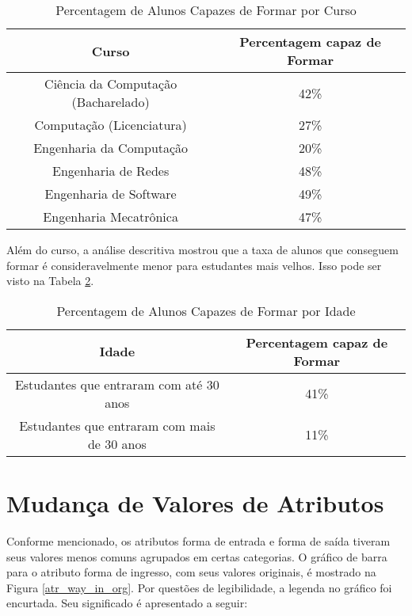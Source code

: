 \begin{table}
\caption{Percentagem de Alunos Capazes de Formar por Curso}
\begin{center}
\begin{tabular}[c]{| c | c |}
    \hline
    \textbf{Curso} & \textbf{Percentagem capaz de Formar} \\
    \hline
    Ciência da Computação (Bacharelado) & 42\% \\
    \hline
    Computação (Licenciatura) & 27\% \\
    \hline
    Engenharia da Computação & 20\% \\
    \hline
    Engenharia de Redes & 48\% \\
    \hline
    Engenharia de Software & 49\% \\
    \hline
    Engenharia Mecatrônica & 47\% \\
    \hline
\end{tabular}
\end{center}
\label{justificativa_4_curso}
\end{table}

\par Além do curso, a análise descritiva mostrou que a taxa de alunos que conseguem
formar é consideravelmente menor para estudantes mais velhos. Isso pode ser visto na
Tabela \ref{justificativa_4_idade}.

\begin{table}
\caption{Percentagem de Alunos Capazes de Formar por Idade}
\begin{center}
\begin{tabular}[c]{| c | c |}
    \hline
    \textbf{Idade} & \textbf{Percentagem capaz de Formar} \\
    \hline
    Estudantes que entraram com até 30 anos & 41\% \\
    \hline
    Estudantes que entraram com mais de 30 anos & 11\% \\
    \hline
\end{tabular}
\end{center}
\label{justificativa_4_idade}
\end{table}

\section{Mudança de Valores de Atributos} \label{just_mud_atr}
Conforme mencionado, os atributos forma de entrada e forma de saída tiveram seus
valores menos comuns agrupados em certas categorias. O gráfico de barra para o
atributo forma de ingresso, com seus valores originais, é mostrado na Figura
\ref{atr_way_in_org}. 
Por questões de legibilidade, a legenda no gráfico foi encurtada. Seu significado é
apresentado a seguir: 

